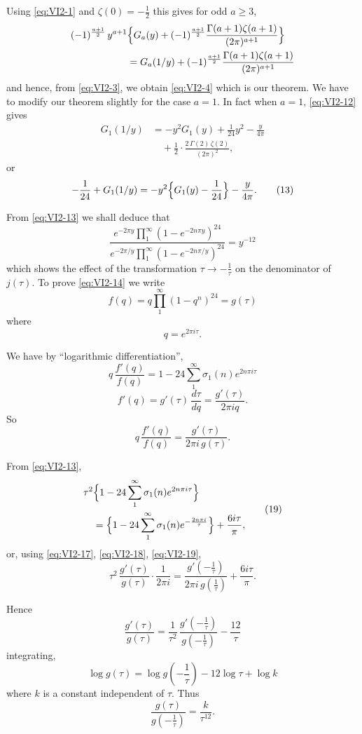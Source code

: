 Using \eqref{eq:VI2-1} and $\zeta(0)=-\frac{1}{2}$ this gives for odd
$a\geq 3$,
\[
\begin{aligned}
(-1)^{\frac{a+1}{2}}\,y^{a+1}&\Bigl\{G_{a}(y)
+(-1)^{\frac{a+1}{2}}\frac{\Gamma(a+1)\zeta(a+1)}{(2\pi)^{a+1}}\Bigr\}\\
&=G_{a}(1/y)+(-1)^{\frac{a+1}{2}}\frac{\Gamma(a+1)\zeta(a+1)}{(2\pi)^{a+1}}
\end{aligned}
\]
and hence, from \eqref{eq:VI2-3}, we obtain \eqref{eq:VI2-4} which is our
theorem. We have to modify our theorem slightly for the case $a=1$. In
fact when $a=1$, \eqref{eq:VI2-12} gives
\[
\begin{aligned}
G_{1}(1/y)&=-y^{2}G_{1}(y)+\frac{1}{24}y^{2}-\frac{y}{4\pi}\\
&\quad+\frac{1}{2}\cdot\frac{2\,\Gamma(2)\,\zeta(2)}{(2\pi)^{2}},
\end{aligned}
\]
or
\[
-\frac{1}{24}+G_{1}(1/y)
=-y^{2}\Bigl\{G_{1}(y)-\frac{1}{24}\Bigr\}-\frac{y}{4\pi}.
\tag{13}\label{eq:VI2-13}
\]

From \eqref{eq:VI2-13} we shall deduce that
\[
\frac{e^{-2\pi y}\prod_{1}^{\infty}(1-e^{-2n\pi y})^{24}}
{e^{-2\pi/y}\prod_{1}^{\infty}(1-e^{-2n\pi/y})^{24}}=y^{-12}
\tag{14}\label{eq:VI2-14}
\]
which shows the effect of the transformation
$\tau\longrightarrow -\frac{1}{\tau}$ on the denominator of $j(\tau)$. To
prove \eqref{eq:VI2-14} we write
\[
f(q)=q\prod_{1}^{\infty}(1-q^{n})^{24}=g(\tau)
\tag{15}\label{eq:VI2-15}
\]
where
\[
q=e^{2\pi i\tau}.
\tag{16}\label{eq:VI2-16}
\]

We have by ``logarithmic differentiation'',
\[
q\,\frac{f'(q)}{f(q)}=1-24\sum_{1}^{\infty}\sigma_{1}(n)e^{2n\pi i\tau}
\tag{17}\label{eq:VI2-17}
\]
\[
f'(q)=g'(\tau)\,\frac{d\tau}{dq}=\frac{g'(\tau)}{2\pi iq}.
\]
So
\[
q\,\frac{f'(q)}{f(q)}=\frac{g'(\tau)}{2\pi i\,g(\tau)}.
\tag{18}\label{eq:VI2-18}
\]

From \eqref{eq:VI2-13},
\[
\begin{aligned}
\tau^{2}&\Bigl\{1-24\sum_{1}^{\infty}\sigma_{1}(n)e^{2n\pi i\tau}\Bigr\}\\
&=\Bigl\{1-24\sum_{1}^{\infty}\sigma_{1}(n)e^{-\frac{2n\pi i}{\tau}}\Bigr\}
+\frac{6i\tau}{\pi},
\end{aligned}
\tag{19}\label{eq:VI2-19}
\]
or, using \eqref{eq:VI2-17}, \eqref{eq:VI2-18}, \eqref{eq:VI2-19},
\[
\tau^{2}\,\frac{g'(\tau)}{g(\tau)}\cdot\frac{1}{2\pi i}
=\frac{g'(-\frac{1}{\tau})}{2\pi i\,g(\frac{1}{\tau})}
+\frac{6i\tau}{\pi}.
\tag{20}\label{eq:VI2-20}
\]

Hence
\[
\frac{g'(\tau)}{g(\tau)}
=\frac{1}{\tau^{2}}\,\frac{g'(-\frac{1}{\tau})}{g(-\frac{1}{\tau})}
-\frac{12}{\tau}
\tag{21}\label{eq:VI2-21}
\]
integrating,
\[
\log g(\tau)=\log g\!\left(-\frac{1}{\tau}\right)-12\log\tau+\log k
\tag{22}\label{eq:VI2-22}
\]
where $k$ is a constant independent of $\tau$. Thus
\[
\frac{g(\tau)}{g(-\frac{1}{\tau})}=\frac{k}{\tau^{12}}.
\tag{23}\label{eq:VI2-23}
\]

